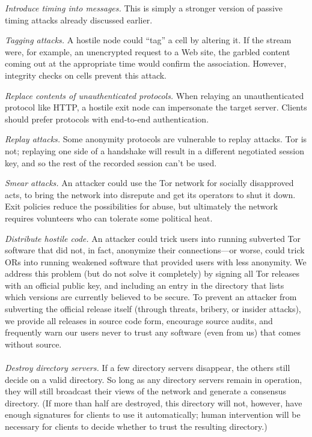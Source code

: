 \documentclass[twocolumn]{article}
\begin{document}
\emph{Introduce timing into messages.} This is simply a stronger
version of passive timing attacks already discussed earlier.

\emph{Tagging attacks.} A hostile node could ``tag'' a
cell by altering it. If the
stream were, for example, an unencrypted request to a Web site,
the garbled content coming out at the appropriate time would confirm
the association. However, integrity checks on cells prevent
this attack.

\emph{Replace contents of unauthenticated protocols.}  When
relaying an unauthenticated protocol like HTTP, a hostile exit node
can impersonate the target server. Clients
should prefer protocols with end-to-end authentication.

\emph{Replay attacks.} Some anonymity protocols are vulnerable
to replay attacks.  Tor is not; replaying one side of a handshake
will result in a different negotiated session key, and so the rest
of the recorded session can't be used.

\emph{Smear attacks.} An attacker could use the Tor network for
socially disapproved acts, to bring the
network into disrepute and get its operators to shut it down.
Exit policies reduce the possibilities for abuse, but
ultimately the network requires volunteers who can tolerate
some political heat.

\emph{Distribute hostile code.} An attacker could trick users
into running subverted Tor software that did not, in fact, anonymize
their connections---or worse, could trick ORs into running weakened
software that provided users with less anonymity.  We address this
problem (but do not solve it completely) by signing all Tor releases
with an official public key, and including an entry in the directory
that lists which versions are currently believed to be secure.  To
prevent an attacker from subverting the official release itself
(through threats, bribery, or insider attacks), we provide all
releases in source code form, encourage source audits, and
frequently warn our users never to trust any software (even from
us) that comes without source.\\

\\
\emph{Destroy directory servers.}  If a few directory
servers disappear, the others still decide on a valid
directory.  So long as any directory servers remain in operation,
they will still broadcast their views of the network and generate a
consensus directory.  (If more than half are destroyed, this
directory will not, however, have enough signatures for clients to
use it automatically; human intervention will be necessary for
clients to decide whether to trust the resulting directory.)
\end{document}
